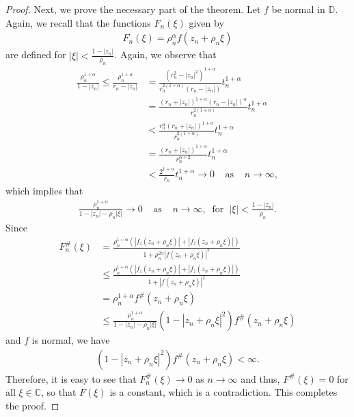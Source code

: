 \documentclass[a4paper,12pt]{amsart}
\theoremstyle{plain}
\theoremstyle{definition}
\begin{document}
\begin{proof}
Next, we prove the necessary part of the theorem. Let $f$ be normal in $\mathbb{D}$. Again, we recall that the functions $F_n(\xi)$ given by
\begin{align*}
	F_n(\xi)=\rho^{\alpha}_n f(z_n+\rho_n\xi)
\end{align*}
are defined for $|\xi|<\frac{1-|z_n|}{\rho_n}$. Again, we observe that
\begin{align*}
	\frac{\rho^{1+\alpha}_n}{1-|z_n|}\leq \frac{\rho^{1+\alpha}_n}{r_n -|z_n|}&= \frac{(r^2_n -|z_n|^2)^{1+\alpha}}{r^{2(1+\alpha)}_n(r_n -|z_n|)}t^{1+\alpha}_n \\&= \frac{(r_n +|z_n|)^{1+\alpha}(r_n -|z_n|)^{\alpha}}{r^{2(1+\alpha)}_n} t^{1+\alpha}_n \\&< \frac{r^{\alpha}_n(r_n +|z_n|)^{1+\alpha}}{r^{2(1+\alpha)}_n} t^{1+\alpha}_n \\&= \frac{(r_n +|z_n|)^{1+\alpha}}{r^{\alpha +2}_n} t^{1+\alpha}_n \\&< \frac{2^{1+\alpha}}{r_n} t^{1+\alpha}_n \rightarrow 0 \;\;\;\;\mbox{as} \;\;\;\;n\rightarrow \infty,
\end{align*}
which implies that
\begin{align*}
	\frac{\rho^{1+\alpha}_n}{1-|z_n|-\rho_n |\xi|}\rightarrow 0 \;\;\;\;\mbox{as} \;\;\;\;n\rightarrow \infty,\;\;\mbox{for}\;\; |\xi|<\frac{1-|z_n|}{\rho_n}.
\end{align*}
Since
\begin{align*}
	F^{\#}_n(\xi)&= \frac{\rho^{1+\alpha}_n\left(|f_z(z_n+\rho_n\xi)| + |f_{\overline{z}}(z_n+\rho_n\xi)|\right)}{1+\rho^{2\alpha}_n |f(z_n+\rho_n\xi)|^2} \\&\leq \frac{\rho^{1+\alpha}_n \left(|f_z(z_n+\rho_n\xi)| + |f_{\overline{z}}(z_n+ \rho_n\xi)| \right)}{1+ |f(z_n+\rho_n\xi)|^2} \\&= \rho^{1+ \alpha}_n f^{\#}(z_n+\rho_n\xi)\\&\leq \frac{\rho^{1+\alpha}_n} {1-|z_n|-\rho_n |\xi|} \left(1 -|z_n+\rho_n\xi|^2\right) f^{\#}(z_n+\rho_n\xi)
\end{align*}
and $f$ is normal, we have
\begin{align*}
	\left(1 -|z_n+\rho_n\xi|^2\right) f^{\#}(z_n+\rho_n\xi)<\infty.
\end{align*}
Therefore, it is easy to see that $F^{\#}_n(\xi)\rightarrow 0$ as $n\rightarrow\infty$ and thus, $F^{\#}(\xi)=0$ for all $\xi\in \mathbb{C}$, so that $F(\xi)$ is a constant, which is a contradiction. This completes the proof.
\end{proof}
\end{document}
